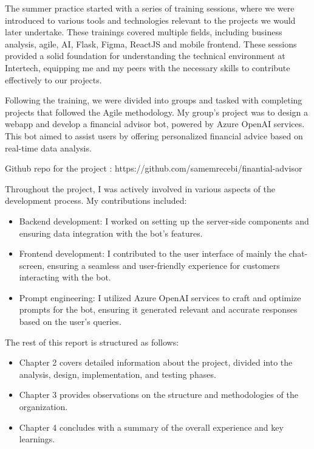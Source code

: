 \documentclass[a4paper,12pt]{report}
\begin{document}
The summer practice started with a series of training sessions, where we were introduced to various tools and technologies relevant to the projects we would later undertake. These trainings covered multiple fields, including business analysis, agile, AI, Flask, Figma, ReactJS and mobile frontend. These sessions provided a solid foundation for understanding the technical environment at Intertech, equipping me and my peers with the necessary skills to contribute effectively to our projects.

Following the training, we were divided into groups and tasked with completing projects that followed the Agile methodology. My group’s project was to design a webapp and develop a financial advisor bot, powered by Azure OpenAI services. This bot aimed to assist users by offering personalized financial advice based on real-time data analysis.

Github repo for the project : https://github.com/samemrecebi/finantial-advisor

Throughout the project, I was actively involved in various aspects of the development process. My contributions included:

\begin{itemize}
    \item Backend development: I worked on setting up the server-side components and ensuring data integration with the bot’s features.
    \item Frontend development: I contributed to the user interface of mainly the chat-screen, ensuring a seamless and user-friendly experience for customers interacting with the bot.
    \item Prompt engineering: I utilized Azure OpenAI services to craft and optimize prompts for the bot, ensuring it generated relevant and accurate responses based on the user's queries.
\end{itemize}

The rest of this report is structured as follows:
\begin{itemize}
    \item Chapter 2 covers detailed information about the project, divided into the analysis, design, implementation, and testing phases.
    \item Chapter 3 provides observations on the structure and methodologies of the organization.
    \item Chapter 4 concludes with a summary of the overall experience and key learnings.
\end{itemize}
\end{document}
